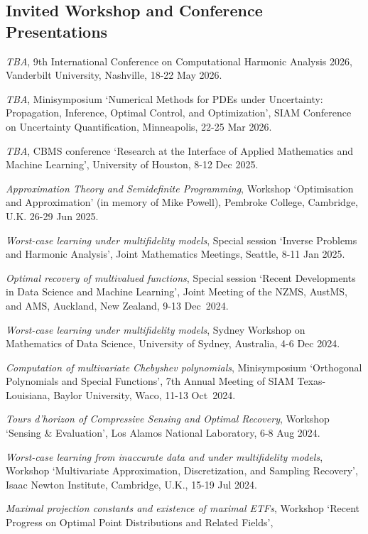 \documentclass[11pt]{article}
\begin{document}
\subsection{Invited Workshop and Conference Presentations}
\bitemize 
\item {\sl TBA}, 
9th International Conference on Computational Harmonic Analysis 2026, Vanderbilt University, Nashville, 18-22 May 2026.
\item {\sl TBA}, Minisymposium `Numerical Methods for PDEs under Uncertainty: Propagation, Inference, Optimal Control, and Optimization',
SIAM Conference on Uncertainty Quantification,
Minneapolis, 22-25 Mar 2026.
\item {\sl TBA},
CBMS conference `Research at the Interface of Applied Mathematics and Machine Learning',
University of Houston,
8-12 Dec 2025.
\item {\sl Approximation Theory and Semidefinite Programming}, Workshop `Optimisation and Approximation'
(in memory of Mike Powell),
Pembroke College, Cambridge, U.K. 
26-29 Jun 2025.
\item {\sl Worst-case learning under multifidelity models}, Special session `Inverse Problems and Harmonic Analysis', Joint Mathematics Meetings, Seattle, 8-11 Jan 2025. 
\item {\sl Optimal recovery of multivalued functions},
Special session `Recent Developments in Data Science and Machine Learning', 
Joint Meeting of the NZMS, AustMS, and AMS, Auckland, New Zealand, 9-13 Dec~2024.
\item {\sl Worst-case learning under multifidelity models},
Sydney Workshop on Mathematics of Data Science,
University of Sydney, Australia, 4-6 Dec 2024.
\item {\sl Computation of multivariate Chebyshev polynomials}, 
Minisymposium  `Orthogonal Polynomials and Special Functions',
7th Annual Meeting of SIAM Texas-Louisiana,
Baylor University, Waco, 11-13 Oct~2024.
\item {\sl Tours d’horizon of Compressive Sensing and Optimal Recovery},
Workshop `Sensing \& Evaluation', Los Alamos National Laboratory, 6-8 Aug 2024.
\item {\sl Worst-case learning from inaccurate data and under multifidelity models},
Workshop `Multivariate Approximation, Discretization, and Sampling Recovery',
Isaac Newton Institute, Cambridge, U.K., 15-19 Jul 2024.
\item {\sl Maximal projection constants and existence of maximal ETFs},
Workshop `Recent Progress on Optimal Point Distributions and Related Fields',
\end{document}
